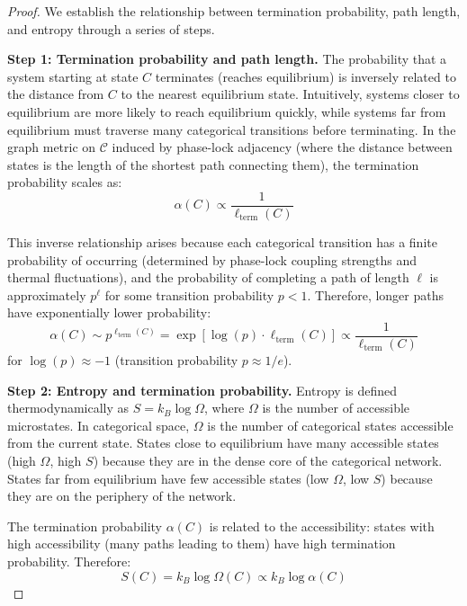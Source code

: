 \documentclass[12pt,a4paper]{article}
\theoremstyle{definition}
\theoremstyle{remark}
\newcommand{\catspace}{\mathcal{C}}
\begin{document}
\begin{proof}
We establish the relationship between termination probability, path length, and entropy through a series of steps.

\textbf{Step 1: Termination probability and path length.}
The probability that a system starting at state $C$ terminates (reaches equilibrium) is inversely related to the distance from $C$ to the nearest equilibrium state. Intuitively, systems closer to equilibrium are more likely to reach equilibrium quickly, while systems far from equilibrium must traverse many categorical transitions before terminating. In the graph metric on $\catspace$ induced by phase-lock adjacency (where the distance between states is the length of the shortest path connecting them), the termination probability scales as:
\begin{equation}
\alpha(C) \propto \frac{1}{\ell_{\text{term}}(C)}
\end{equation}

This inverse relationship arises because each categorical transition has a finite probability of occurring (determined by phase-lock coupling strengths and thermal fluctuations), and the probability of completing a path of length $\ell$ is approximately $p^\ell$ for some transition probability $p < 1$. Therefore, longer paths have exponentially lower probability:
\begin{equation}
\alpha(C) \sim p^{\ell_{\text{term}}(C)} = \exp[\log(p) \cdot \ell_{\text{term}}(C)] \propto \frac{1}{\ell_{\text{term}}(C)}
\end{equation}
for $\log(p) \approx -1$ (transition probability $p \approx 1/e$).

\textbf{Step 2: Entropy and termination probability.}
Entropy is defined thermodynamically as $S = k_B \log \Omega$, where $\Omega$ is the number of accessible microstates. In categorical space, $\Omega$ is the number of categorical states accessible from the current state. States close to equilibrium have many accessible states (high $\Omega$, high $S$) because they are in the dense core of the categorical network. States far from equilibrium have few accessible states (low $\Omega$, low $S$) because they are on the periphery of the network.

The termination probability $\alpha(C)$ is related to the accessibility: states with high accessibility (many paths leading to them) have high termination probability. Therefore:
\begin{equation}
S(C) = k_B \log \Omega(C) \propto k_B \log \alpha(C)
\end{equation}


\end{proof}
\end{document}
